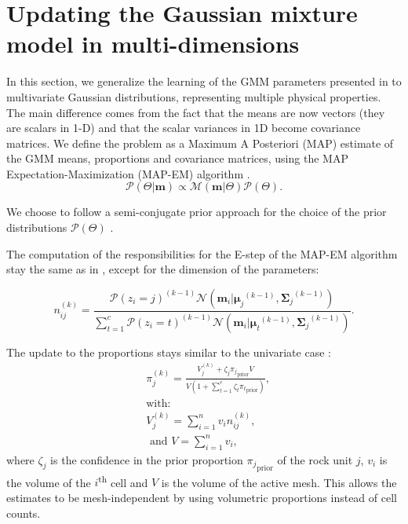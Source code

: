 \documentclass[extra, mreferee]{gji_joint} %
\begin{document}
\section{Updating the Gaussian mixture model in multi-dimensions} \label{UpdateTheta}

In this section, we generalize the learning of the GMM parameters presented in \citet{ggz389} to multivariate Gaussian distributions, representing multiple physical properties. The main difference comes from the fact that the means are now vectors (they are scalars in 1-D) and that the scalar variances in 1D become covariance matrices. We define the problem as a Maximum A Posteriori (MAP) estimate of the GMM means, proportions and covariance matrices, using the MAP Expectation-Maximization (MAP-EM) algorithm \citep{ExpectationMaximization}.
\begin{equation}
\mathcal{P}(\Theta|\mathbf{m}) \propto \mathcal{M}(\mathbf{m}|\Theta)\mathcal{P}(\Theta).
\label{theta_posterior}
\end{equation}

We choose to follow a semi-conjugate prior approach for the choice of the prior distributions $\mathcal{P}(\Theta)$ \citep{ggz389, Murphy2012}.

The computation of the responsibilities for the E-step of the MAP-EM algorithm stay the same as in \citet{ggz389}, except for the dimension of the parameters:

\begin{equation}
n_{ij}^{(k)} = \frac{\mathcal{P}(z_i=j)^{(k-1)}\mathcal{N}(\mathbf{m}_i|{\mathbf{\mu}_j}^{(k-1)}, {\mathbf{\Sigma}_j}^{(k-1)})}{ \sum_{t=1}^c \mathcal{P}(z_i=t)^{(k-1)} \mathcal{N}({\mathbf{m}}_i|{\mathbf{\mu}_t}^{(k-1)}, {\mathbf{\Sigma}_j}^{(k-1)})} \label{eq:responsibilities}.
\end{equation}

The update to the proportions stays similar to the univariate case \citep{ggz389}:
\begin{align}
&{\pi}^{(k)}_j = \frac{V_{j}^{(k)}+\zeta_j {{\pi}_j}_{\text{prior}}V}{V(1+\sum_{t=1}^c \zeta_t {{\pi}_t}_{\text{prior}})} \label{eq:pi_update}, \\
&\text{with:} \nonumber\\
&V_{j}^{(k)} = \sum^n_{i=1} v_i n_{ij}^{(k)}, \label{VolumeProportions}\\
&\text{ and } V=\sum^n_{i=1} v_i,
\end{align}
where $\zeta_j$ is the confidence in the prior proportion ${\pi_j}_{\text{prior}}$ of the rock unit $j$, $v_i$ is the volume of the $i$\textsuperscript{th} cell and $V$ is the volume of the
active mesh. This allows the estimates to be mesh-independent by using volumetric proportions instead of cell counts.
\end{document}
